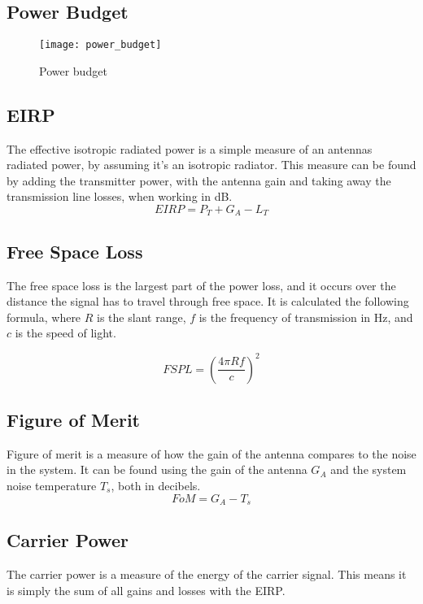 \begin{landscape}
		\clearpage\pagestyle{empty} 
\subsection{Power Budget}
	\begin{figure}[H]
		\centering
		\texttt{[image: power\_budget]}
		\caption{Power budget}
		\label{fig_pwrBud}
	\end{figure}
\end{landscape}

\subsection{EIRP}
The effective isotropic radiated power is a simple measure of an antennas radiated power, by assuming it's an isotropic radiator\cite{SMAD}.
This measure can be found by adding the transmitter power, with the antenna gain and taking away the transmission line losses, when working in dB.
\begin{equation}
EIRP=P_{T}+G_{A}-L_{T}
\end{equation}

\subsection{Free Space Loss}
The free space loss is the largest part of the power loss, and it occurs over the distance the signal has to travel through free space. It is calculated the following formula, where $R$ is the slant range, $f$ is the frequency of transmission in Hz, and $c$ is the speed of light.

\begin{equation}
FSPL=(\frac{4\pi Rf}{c})^2
\end{equation}

\subsection{Figure of Merit}
Figure of merit is a measure of how the gain of the antenna compares to the noise in the system. It can be found using the gain of the antenna $G_{A}$ and the system noise temperature $T_{s}$, both in decibels.
\begin{equation}
FoM=G_{A}-T_{s}
\end{equation}

\subsection{Carrier Power}
The carrier power is a measure of the energy of the carrier signal. This means it is simply the sum of all gains and losses with the EIRP.

